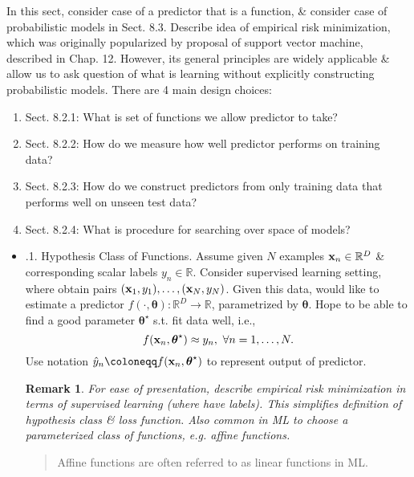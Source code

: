 \documentclass{article}
\newtheorem{remark}{Remark}
\begin{document}
\begin{itemize}
\begin{itemize}
		In this sect,  consider case of a predictor that is a function, \& consider case of probabilistic models in Sect. 8.3. Describe idea of empirical risk minimization, which was originally popularized by proposal of support vector machine, described in Chap. 12. However, its general principles are widely applicable \& allow us to ask question of what is learning without explicitly constructing probabilistic models. There are 4 main design choices:
		\begin{enumerate}
			\item Sect. 8.2.1: What is set of functions we allow predictor to take?
			\item Sect. 8.2.2: How do we measure how well predictor performs on training data?
			\item Sect. 8.2.3: How do we construct predictors from only training data that performs well on unseen test data?
			\item Sect. 8.2.4: What is procedure for searching over space of models?
		\end{enumerate}
		
		\begin{itemize}
			\item {.1. Hypothesis Class of Functions.} Assume given $N$ examples ${\bf x}_n\in\mathbb{R}^D$ \& corresponding scalar labels $y_n\in\mathbb{R}$. Consider supervised learning setting, where obtain pairs $({\bf x}_1,y_1),\ldots,({\bf x}_N,y_N)$. Given this data, would like to estimate a predictor $f(\cdot,\boldsymbol{\theta}):\mathbb{R}^D\to\mathbb{R}$, parametrized by $\boldsymbol{\theta}$. Hope to be able to find a good parameter $\boldsymbol{\theta}^\star$ s.t. fit data well, i.e.,
			\begin{equation}
				f({\bf x}_n,\boldsymbol{\theta}^\star)\approx y_n,\ \forall n = 1,\ldots,N.
			\end{equation}
			Use notation $\hat{y}_n\coloneqq f({\bf x}_n,\boldsymbol{\theta}^\star)$ to represent output of predictor.
			\begin{remark}
				For ease of presentation, describe empirical risk minimization in terms of supervised learning (where have labels). This simplifies definition of hypothesis class \& loss function. Also common in ML to choose a parameterized class of functions, e.g. affine functions.
			\end{remark}
			
			\begin{quote}
				Affine functions are often referred to as linear functions in ML.
			\end{quote}
			

\end{itemize}
\end{itemize}
\end{itemize}
\end{document}
